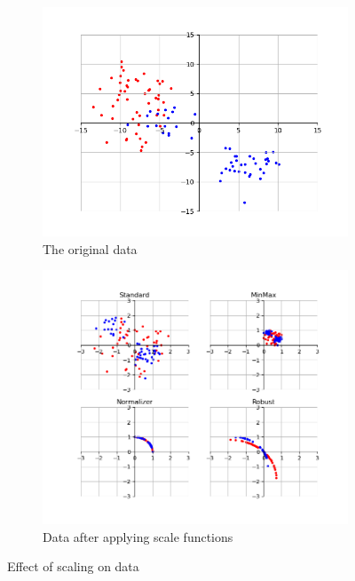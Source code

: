 \documentclass{article}
\begin{document}
\begin{figure}[H]
\centering
\begin{subfigure}{.5\textwidth}
  \centering
  \includegraphics[width=\linewidth]{Images/orig_data_scaling.png}
  \caption{The original data}
\end{subfigure}%
\begin{subfigure}{.5\textwidth}
  \centering
  \includegraphics[width=\linewidth]{Images/scaled_data.png}
  \caption{Data after applying scale functions}
\end{subfigure}
\caption{Effect of scaling on data}
\end{figure}
\end{document}

